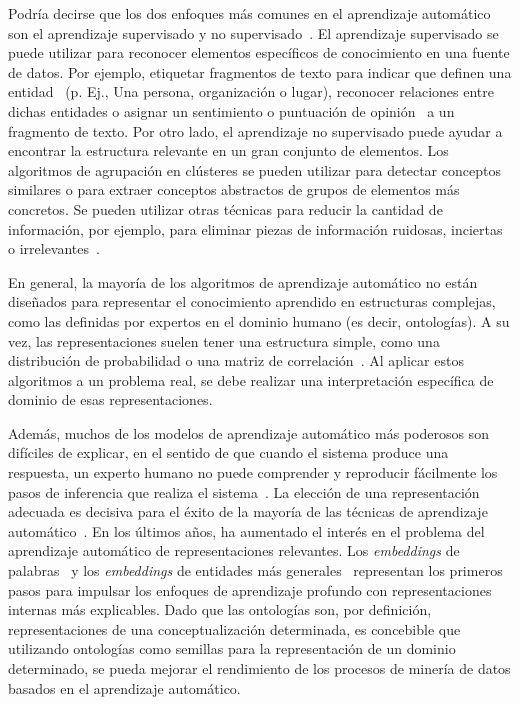 Podría decirse que los dos enfoques más comunes en el aprendizaje automático son el aprendizaje supervisado y no supervisado~\cite{kevin2012machine}.
El aprendizaje supervisado se puede utilizar para reconocer elementos específicos de conocimiento en una fuente de datos.
Por ejemplo, etiquetar fragmentos de texto para indicar que definen una entidad~\cite{nadeau2007survey} (p. Ej., Una persona, organización o lugar), reconocer relaciones entre dichas entidades o asignar un sentimiento o puntuación de opinión~\cite{liu2012sentiment} a un fragmento de texto.
Por otro lado, el aprendizaje no supervisado puede ayudar a encontrar la estructura relevante en un gran conjunto de elementos.
Los algoritmos de agrupación en clústeres se pueden utilizar para detectar conceptos similares o para extraer conceptos abstractos de grupos de elementos más concretos.
Se pueden utilizar otras técnicas para reducir la cantidad de información, por ejemplo, para eliminar piezas de información ruidosas, inciertas o irrelevantes~\cite{bingham2001random}.

En general, la mayoría de los algoritmos de aprendizaje automático no están diseñados para representar el conocimiento aprendido en estructuras complejas, como las definidas por expertos en el dominio humano (es decir, ontologías).
A su vez, las representaciones suelen tener una estructura simple, como una distribución de probabilidad o una matriz de correlación~\cite{bengio2013representation}. Al aplicar estos algoritmos a un problema real, se debe realizar una interpretación específica de dominio de esas representaciones.

Además, muchos de los modelos de aprendizaje automático más poderosos son difíciles de explicar, en el sentido de que cuando el sistema produce una respuesta, un experto humano no puede comprender y reproducir fácilmente los pasos de inferencia que realiza el sistema~\cite{olden2002illuminating}.
La elección de una representación adecuada es decisiva para el éxito de la mayoría de las técnicas de aprendizaje automático~\cite{bengio2012deep}.
En los últimos años, ha aumentado el interés en el problema del aprendizaje automático de representaciones relevantes.
Los \textit{embeddings} de palabras~\cite{mikolov} y los \textit{embeddings} de entidades más generales~\cite{hu2015entity} representan los primeros pasos para impulsar los enfoques de aprendizaje profundo con representaciones internas más explicables.
Dado que las ontologías son, por definición, representaciones de una conceptualización determinada, es concebible que utilizando ontologías como semillas para la representación de un dominio determinado, se pueda mejorar el rendimiento de los procesos de minería de datos basados en el aprendizaje automático.

